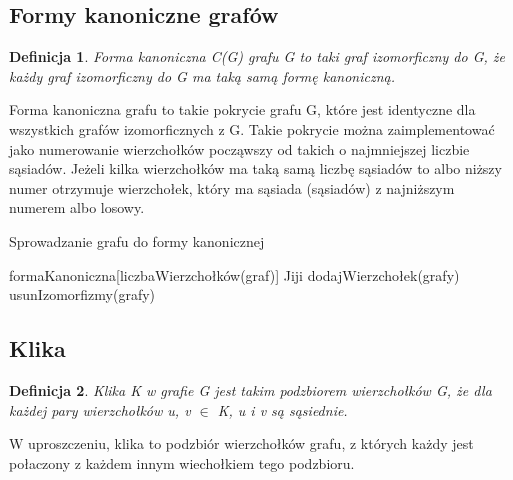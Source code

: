 \documentclass[11pt]{article}
\newtheorem{definition}{Definicja}[section]
\begin{document}
  \subsection{Formy kanoniczne grafów}

  \begin{definition}
    Forma kanoniczna C(G) grafu G to taki graf izomorficzny do G, że każdy graf izomorficzny do G ma taką samą formę kanoniczną. 
  \end{definition}
  Forma kanoniczna grafu to takie pokrycie grafu G, 
  które jest identyczne dla wszystkich grafów izomorficznych z G. Takie pokrycie można zaimplementować
   jako numerowanie wierzchołków począwszy od takich o najmniejszej liczbie sąsiadów. 
   Jeżeli kilka wierzchołków ma taką samą liczbę sąsiadów to albo niższy numer otrzymuje wierzchołek, 
   który ma sąsiada (sąsiadów) z najniższym numerem albo losowy. 

   \begin{algorithm}
    \caption{Sprowadzanie grafu do formy kanonicznej}
    \begin{algorithmic}
    \STATE formaKanoniczna[liczbaWierzchołków(graf)]
        \STATE Jiji
      \ENDWHILE
    \ENDFOR
      \STATE dodajWierzchołek(grafy)
      \STATE usunIzomorfizmy(grafy)
    \ENDWHILE
    \end{algorithmic}
    \end{algorithm}

   \subsection{Klika}
   \begin{definition}
    Klika K w grafie G jest takim podzbiorem wierzchołków G, że dla każdej pary wierzchołków u, v $\in$ K, u i v są sąsiednie. 
   \end{definition}
   
   W uproszczeniu, klika to podzbiór wierzchołków grafu, z których każdy jest połaczony z każdem innym wiechołkiem tego podzbioru.
   \begin{figure}[h]
   \centering
     \caption{}
  \end{figure}
\end{document}
